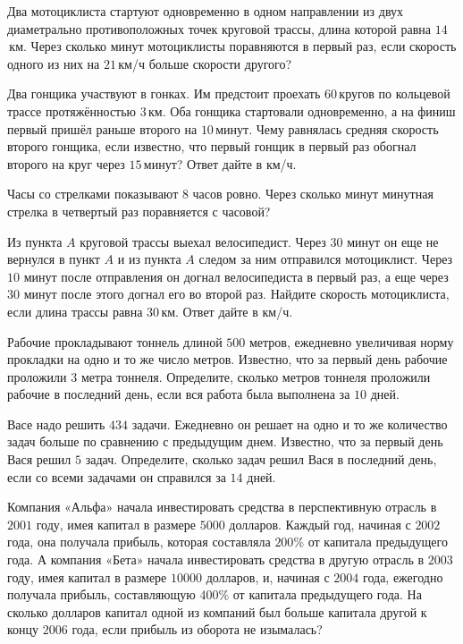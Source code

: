 \begin{class}[number=3]
	\begin{listofex}
		\item {}
		\item {}
		\item {}
		\item {}
		\item Два мотоциклиста стартуют одновременно в одном направлении из двух диаметрально противоположных точек круговой трассы, длина которой равна \( 14 \) км. Через сколько минут мотоциклисты поравняются в первый раз, если скорость одного из них на \( 21 \) км/ч больше скорости другого?
		\item Два гонщика участвуют в гонках. Им предстоит проехать \( 60 \) кругов по кольцевой трассе протяжённостью \( 3 \) км. Оба гонщика стартовали одновременно, а на финиш первый пришёл раньше второго на \( 10 \) минут. Чему равнялась средняя скорость второго гонщика, если известно, что первый гонщик в первый раз обогнал второго на круг через \( 15 \) минут? Ответ дайте в км/ч.
		\item Часы со стрелками показывают \( 8 \) часов ровно. Через сколько минут минутная стрелка в четвертый раз поравняется с часовой?
		\item Из пункта \( A \) круговой трассы выехал велосипедист. Через \( 30 \) минут он еще не вернулся в пункт \( A \) и из пункта \( A \) следом за ним отправился мотоциклист. Через \( 10 \) минут после отправления он догнал велосипедиста в первый раз, а еще через \( 30 \) минут после этого догнал его во второй раз. Найдите скорость мотоциклиста, если длина трассы равна \( 30 \) км. Ответ дайте в км/ч.
		\item Рабочие прокладывают тоннель длиной \( 500 \) метров, ежедневно увеличивая норму прокладки на одно и то же число метров. Известно, что за первый день рабочие проложили \( 3 \) метра тоннеля. Определите, сколько метров тоннеля проложили рабочие в последний день, если вся работа была выполнена за \( 10 \) дней.
		\item Васе надо решить \( 434 \) задачи. Ежедневно он решает на одно и то же количество задач больше по сравнению с предыдущим днем. Известно, что за первый день Вася решил \( 5 \) задач. Определите, сколько задач решил Вася в последний день, если со всеми задачами он справился за \( 14 \) дней.
		\item Компания «Альфа» начала инвестировать средства в перспективную отрасль в \( 2001 \) году, имея капитал в размере \( 5000 \) долларов. Каждый год, начиная с \( 2002 \) года, она получала прибыль, которая составляла \( 200\% \) от капитала предыдущего года. А компания «Бета» начала инвестировать средства в другую отрасль в \( 2003 \) году, имея капитал в размере \( 10 000 \) долларов, и, начиная с \( 2004 \) года, ежегодно получала прибыль, составляющую \( 400\% \) от капитала предыдущего года. На сколько долларов капитал одной из компаний был больше капитала другой к концу \( 2006 \) года, если прибыль из оборота не изымалась?
		\item {}
	\end{listofex}
\end{class}
